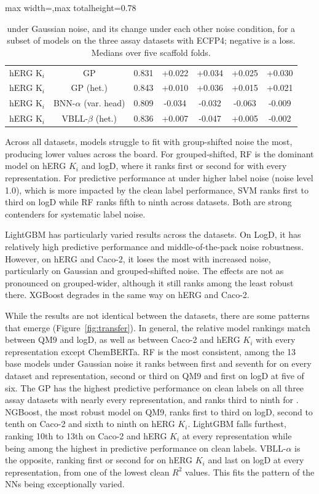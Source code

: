 \begin{table}[!htbp]
\begin{adjustbox}{max width=\textwidth,max totalheight=0.78\textheight}
\begin{tabular}{lcccccc}
hERG K$_i$ & GP & 0.831 & +0.022 & +0.034 & +0.025 & +0.030 \\
hERG K$_i$ & GP (het.) & 0.843 & +0.010 & +0.036 & +0.015 & +0.021 \\
hERG K$_i$ & BNN-$\alpha$ (var. head) & 0.809 & -0.034 & -0.032 & -0.063 & -0.009 \\
hERG K$_i$ & VBLL-$\beta$ (het.) & 0.836 & +0.007 & -0.047 & +0.005 & -0.002 \\
\bottomrule
\end{tabular}
\end{adjustbox}
\caption[Robustness under the noise distributions on the three assay datasets.]{\aucnorm{} under Gaussian noise, and its change under each other noise condition, for a subset of models on the three assay datasets with ECFP4; negative is a loss. Medians over five scaffold folds.}
\label{tab:assay_shape}
\end{table}

Across all datasets, models struggle to fit with group-shifted noise the most, producing lower \aucnorm{} values across the board. For grouped-shifted, RF is the dominant model on hERG $K_i$ and logD, where it ranks first or second for \aucnorm{} with every representation. For predictive performance at under higher label noise (noise level 1.0), which is more impacted by the clean label performance, SVM ranks first to third on logD while RF ranks fifth to ninth across datasets. Both are strong contenders for systematic label noise.

LightGBM has particularly varied results across the datasets. On LogD, it has relatively high predictive performance and middle-of-the-pack noise robustness. However, on hERG and Caco-2, it loses the most with increased noise, particularly on Gaussian and grouped-shifted noise. The effects are not as pronounced on grouped-wider, although it still ranks among the least robust there.  XGBoost degrades in the same way on hERG and Caco-2.

While the results are not identical between the datasets, there are some patterns that emerge (Figure~\ref{fig:transfer}). In general, the relative \aucnorm{} model rankings match between QM9 and logD, as well as between Caco-2 and hERG $K_i$ with every representation except ChemBERTa.  RF is the most consistent, among the 13 base models under Gaussian noise it ranks between first and seventh for \aucnorm{} on every dataset and representation, second or third on QM9 and first on logD at five of six. The GP has the highest predictive performance on clean labels on all three assay datasets with nearly every representation, and ranks third to ninth for \aucnorm. NGBoost, the most robust model on QM9, ranks first to third on logD, second to tenth on Caco-2 and sixth to ninth on hERG $K_i$. LightGBM falls furthest, ranking 10th to 13th on Caco-2 and hERG $K_i$ at every representation while being among the highest in predictive performance on clean labels. VBLL-$\alpha$ is the opposite, ranking first or second for \aucnorm{} on hERG
$K_i$ and last on logD at every representation, from one of the lowest clean $R^2$ values. This fits the pattern of the NNs being exceptionally varied.

